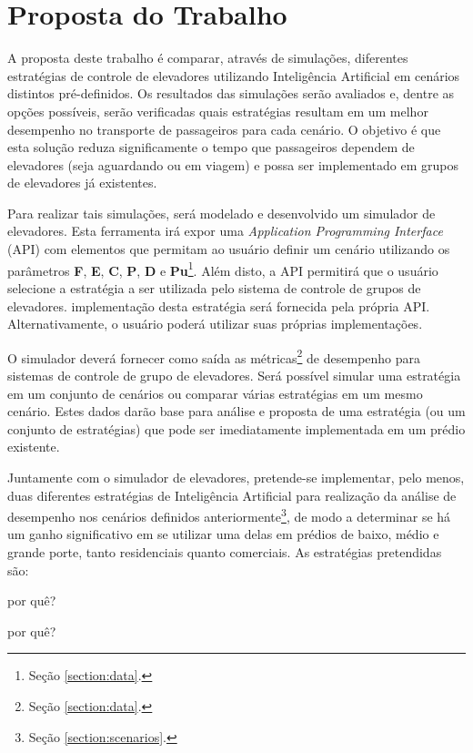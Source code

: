 \chapter{\label{chap:proposal}Proposta do Trabalho}

A proposta deste trabalho é comparar, através de simulações, diferentes
estratégias de controle de elevadores utilizando Inteligência Artificial em
cenários distintos pré-definidos. Os resultados das simulações serão avaliados
e, dentre as opções possíveis, serão verificadas quais estratégias resultam em
um melhor desempenho no transporte de passageiros para cada cenário. O objetivo
é que esta solução reduza significamente o tempo que passageiros dependem de
elevadores (seja aguardando ou em viagem) e possa ser implementado em grupos de
elevadores já existentes.

Para realizar tais simulações, será modelado e desenvolvido um simulador de
elevadores. Esta ferramenta irá expor uma \textit{Application Programming
Interface} (API) com elementos que permitam ao usuário definir um cenário
utilizando os parâmetros \textbf{F}, \textbf{E}, \textbf{C}, \textbf{P},
\textbf{D} e \textbf{Pu}\footnote{Seção \ref{section:data}.}. Além disto, a API
permitirá que o usuário selecione a estratégia a ser utilizada pelo sistema de
controle de grupos de elevadores. implementação desta estratégia será fornecida
pela própria API. Alternativamente, o usuário poderá utilizar suas próprias
implementações.

O simulador deverá fornecer como saída as métricas\footnote{Seção
\ref{section:data}.} de desempenho para sistemas de controle de grupo de
elevadores. Será possível simular uma estratégia em um conjunto de cenários ou
comparar várias estratégias em um mesmo cenário. Estes dados darão base para
análise e proposta de uma estratégia (ou um conjunto de estratégias) que pode
ser imediatamente implementada em um prédio existente.

Juntamente com o simulador de elevadores, pretende-se implementar, pelo menos,
duas diferentes estratégias de Inteligência Artificial para realização da
análise de desempenho nos cenários definidos anteriormente\footnote{Seção
\ref{section:scenarios}.}, de modo a determinar se há um ganho significativo em
se utilizar uma delas em prédios de baixo, médio e grande porte, tanto
residenciais quanto comerciais. As estratégias pretendidas são:

\begin{description}[leftmargin=!,labelwidth=\widthof{\bfseries Aprendizado de máquina}]
  \item[Sistemas multi-agentes] por quê?
  \item[Aprendizado de máquina] por quê?
\end{description}
